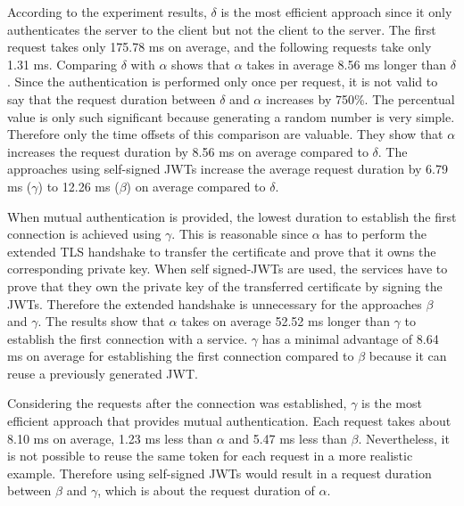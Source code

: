 According to the experiment results, $\delta$ is the most efficient approach since it only authenticates the server to the client but not the client to the server.
The first request takes only 175.78 ms on average, and the following requests take only 1.31 ms.
Comparing $\delta$ with $\alpha$ shows that $\alpha$ takes in average 8.56 ms longer than $\delta$.
Since the authentication is performed only once per request, it is not valid to say that the request duration between $\delta$ and $\alpha$ increases by 750\%.
The percentual value is only such significant because generating a random number is very simple.
Therefore only the time offsets of this comparison are valuable.
They show that $\alpha$ increases the request duration by 8.56 ms on average compared to $\delta$.
The approaches using self-signed JWTs increase the average request duration by 6.79 ms ($\gamma$) to 12.26 ms ($\beta$) on average compared to $\delta$. 

When mutual authentication is provided, the lowest duration to establish the first connection is achieved using $\gamma$.
This is reasonable since $\alpha$ has to perform the extended TLS handshake to transfer the certificate and prove that it owns the corresponding private key.
When self signed-JWTs are used, the services have to prove that they own the private key of the transferred certificate by signing the JWTs.
Therefore the extended handshake is unnecessary for the approaches $\beta$ and $\gamma$.
The results show that $\alpha$ takes on average 52.52 ms longer than $\gamma$ to establish the first connection with a service.
$\gamma$ has a minimal advantage of 8.64 ms on average for establishing the first connection compared to $\beta$ because it can reuse a previously generated JWT.

Considering the requests after the connection was established, $\gamma$ is the most efficient approach that provides mutual authentication.
Each request takes about 8.10 ms on average, 1.23 ms less than $\alpha$ and 5.47 ms less than $\beta$.
Nevertheless, it is not possible to reuse the same token for each request in a more realistic example.
Therefore using self-signed JWTs would result in a request duration between $\beta$ and $\gamma$, which is about the request duration of $\alpha$.

